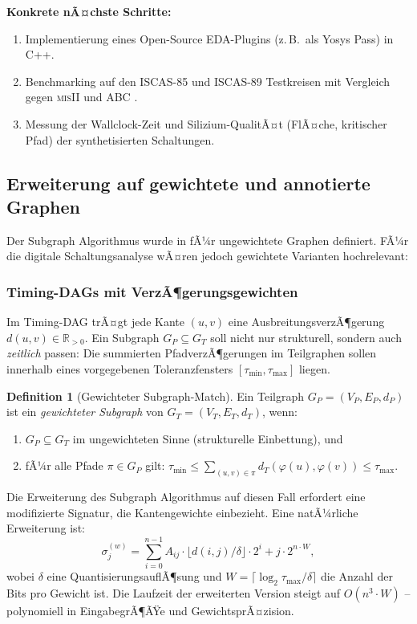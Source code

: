 ﻿\documentclass[a4paper,12pt]{article}
\theoremstyle{definition}
\newtheorem{definition}{Definition}
\begin{document}
\textbf{Konkrete nÃ¤chste Schritte:}
\begin{enumerate}
  \item Implementierung eines Open-Source EDA-Plugins (z.\,B.\ als Yosys \cite{wolf2013yosys}
        Pass) in C++.
  \item Benchmarking auf den ISCAS-85 und ISCAS-89 Testkreisen
        \cite{brglez1985combinational} mit Vergleich gegen \textsc{misII} und ABC
        \cite{brayton2010abc}.
  \item Messung der Wallclock-Zeit und Silizium-QualitÃ¤t (FlÃ¤che, kritischer Pfad) der
        synthetisierten Schaltungen.
\end{enumerate}

\subsection{Erweiterung auf gewichtete und annotierte Graphen}

Der Subgraph Algorithmus wurde in \cite{subgraph2026} fÃ¼r ungewichtete Graphen definiert.
FÃ¼r die digitale Schaltungsanalyse wÃ¤ren jedoch gewichtete Varianten hochrelevant:

\subsubsection{Timing-DAGs mit VerzÃ¶gerungsgewichten}

Im Timing-DAG trÃ¤gt jede Kante $(u,v)$ eine AusbreitungsverzÃ¶gerung $d(u,v) \in \mathbb{R}_{>0}$.
Ein Subgraph $G_P \subseteq G_T$ soll nicht nur strukturell, sondern auch \emph{zeitlich}
passen: Die summierten PfadverzÃ¶gerungen im Teilgraphen sollen innerhalb eines
vorgegebenen Toleranzfensters $[\tau_{\min}, \tau_{\max}]$ liegen.

\begin{definition}[Gewichteter Subgraph-Match]\label{def:weighted_match}
  Ein Teilgraph $G_P = (V_P, E_P, d_P)$ ist ein \emph{gewichteter Subgraph} von
  $G_T = (V_T, E_T, d_T)$, wenn:
  \begin{enumerate}
    \item $G_P \subseteq G_T$ im ungewichteten Sinne (strukturelle Einbettung), und
    \item fÃ¼r alle Pfade $\pi \in G_P$ gilt:
          $\tau_{\min} \leq \sum_{(u,v) \in \pi} d_T(\varphi(u), \varphi(v)) \leq \tau_{\max}$.
  \end{enumerate}
\end{definition}

Die Erweiterung des Subgraph Algorithmus auf diesen Fall erfordert eine modifizierte
Signatur, die Kantengewichte einbezieht. Eine natÃ¼rliche Erweiterung ist:
\[
  \sigma_j^{(w)} = \sum_{i=0}^{n-1} A_{ij} \cdot \lfloor d(i,j) / \delta \rfloor \cdot 2^i
  + j \cdot 2^{n \cdot W},
\]
wobei $\delta$ eine QuantisierungsauflÃ¶sung und $W = \lceil \log_2 \tau_{\max}/\delta \rceil$
die Anzahl der Bits pro Gewicht ist. Die Laufzeit der erweiterten Version steigt auf
$O(n^3 \cdot W)$ -- polynomiell in EingabegrÃ¶ÃŸe und GewichtsprÃ¤zision.
\end{document}
